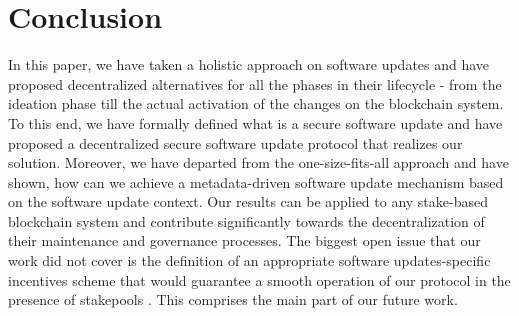 \section{Conclusion} \label{sec:conclusion}
In this paper, we have taken a holistic approach on software updates and have 
proposed decentralized alternatives for all the phases in their lifecycle - 
from the ideation phase till the actual activation of the changes on the 
blockchain system. To this end, we have formally defined what is a secure 
software update and have proposed a decentralized secure software update 
protocol that realizes our solution. Moreover, we have departed from the 
one-size-fits-all approach and have shown, how can we achieve a metadata-driven 
software update mechanism based on the software update context. Our results can 
be applied to any stake-based blockchain system and contribute significantly 
towards the decentralization of their maintenance and governance processes. The 
biggest open issue that our work did not cover is the definition of an 
appropriate software updates-specific incentives scheme that would guarantee a 
smooth operation of our protocol in the presence of stakepools 
\cite{stakepools}. This comprises the main part of our future work.
